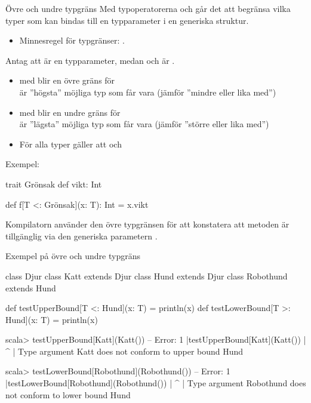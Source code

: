 \begin{Slide}{Övre och undre typgräns}\SlideFontSmall
Med typoperatorerna \code{<:} och \code{>:} går det att begränsa vilka typer som kan bindas till en typparameter i en generiska struktur.
\begin{itemize}
  \item Minnesregel för typgränser: . 
\end{itemize}
\vspace{0.5em}Antag att  är en  typparameter, medan  och  är . 
\begin{itemize}
  \item med  blir  en övre gräns  för \\ är ''högsta'' möjliga typ som  får vara (jämför ''mindre eller lika med'')
  \item med  blir  en undre gräns  för \\ är ''lägsta'' möjliga typ som  får vara  (jämför ''större eller lika med'')
  \item För alla typer  gäller att  och 
\end{itemize} 
\pause

\vspace{0.5em}Exempel: 
\begin{Code}
  trait Grönsak { def vikt: Int }

  def f[T <: Grönsak](x: T): Int = x.vikt
\end{Code}

Kompilatorn använder den övre typgränsen för att konstatera att metoden  är tillgänglig via den generiska parametern .

\end{Slide}

\begin{Slide}{Exempel på övre och undre typgräns}

\begin{Code}
class Djur
class Katt extends Djur 
class Hund extends Djur
class Robothund extends Hund

def testUpperBound[T <: Hund](x: T) = println(x)
def testLowerBound[T >: Hund](x: T) = println(x)
\end{Code}

\begin{REPL}
scala> testUpperBound[Katt](Katt())
-- Error:
1 |testUpperBound[Katt](Katt())
  |          ^
  |          Type argument Katt does not conform to upper bound Hund

scala> testLowerBound[Robothund](Robothund())
-- Error:
1 |testLowerBound[Robothund](Robothund())
  |          ^
  |          Type argument Robothund does not conform to lower bound Hund
\end{REPL}

\end{Slide}


